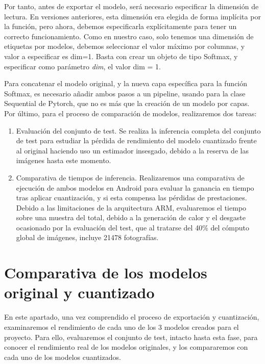 Por tanto, antes de exportar el modelo, será necesario especificar la dimensión de lectura. En versiones anteriores, esta dimensión era elegida de forma implícita por la función, pero ahora, debemos especificarla explícitamente para tener un correcto funcionamiento. Como en nuestro caso, solo tenemos una dimensión de etiquetas por modelos, debemos seleccionar el valor máximo por columnas, y valor a especificar es dim=1. Basta con crear un objeto de tipo Softmax, y especificar como parámetro \textit{dim}, el valor dim = 1.

Para concatenar el modelo original, y la nueva capa específica para la función Softmax, es necesario añadir ambos pasos a un pipeline, usando para la clase Sequential de Pytorch, que no es más que la creación de un modelo por capas.\\

Por último, para el proceso de comparación de modelos, realizaremos dos tareas:
\begin{enumerate}
	\item Evaluación del conjunto de test. Se realiza la inferencia completa del conjunto de test para estudiar la pérdida de rendimiento del modelo cuantizado frente al original haciendo uso un estimador insesgado, debido a la reserva de las imágenes hasta este momento.
	\item Comparativa de tiempos de inferencia. Realizaremos una comparativa de ejecución de ambos modelos en Android para evaluar la ganancia en tiempo tras aplicar cuantización, y si esta compensa las pérdidas de prestaciones. Debido a las limitaciones de la arquitectura ARM, evaluaremos el tiempo sobre una muestra del total, debido a la generación de calor y el desgaste ocasionado por la evaluación del test, que al tratarse del 40\% del cómputo global de imágenes, incluye 21478 fotografías.

\end{enumerate}

\section{Comparativa de los modelos original y cuantizado}

En este apartado, una vez comprendido el proceso de exportación y cuantización, examinaremos el rendimiento de cada uno de los 3 modelos creados para el proyecto. Para ello, evaluaremos el conjunto de test, intacto hasta esta fase, para conocer el rendimiento real de los modelos originales, y los compararemos con cada uno de los modelos cuantizados.

